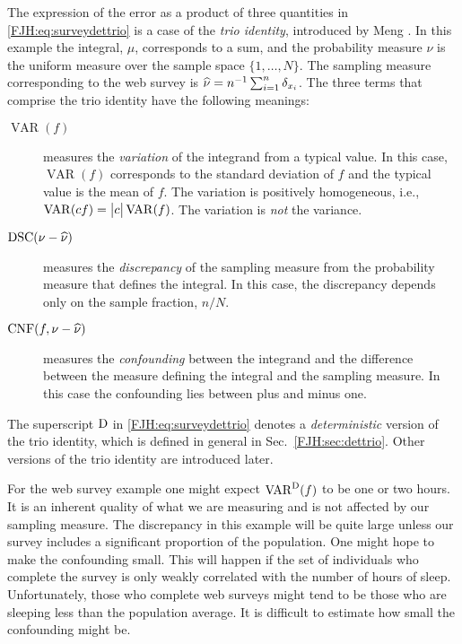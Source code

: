 \documentclass[graybox,footinfo]{svmult}
\DeclareMathOperator{\algn}{CNF}
\DeclareMathOperator{\disc}{DSC}
\DeclareMathOperator{\Var}{VAR}
\begin{document}
The expression of the error as a product of three quantities in 
\eqref{FJH:eq:surveydettrio} is a case of the \emph{trio identity}, introduced by Meng 
\cite{Men16a}.  In this example the integral, $\mu$, corresponds to a sum, 
and the probability measure $\nu$ is the uniform measure over the sample space $\{1, 
\ldots, N\}$.  The sampling measure corresponding to the web survey is $\widehat{\nu} = 
n^{-1} \sum_{i=1}^n \delta_{x_i}$.  The three terms that comprise the trio identity have the 
following meanings:
\begin{description}
	\item[$\Var(f)$] measures the \emph{variation} of the integrand from a typical value. 
	In 	this case, $\Var(f)$ corresponds to the standard deviation of $f$ and the typical 
	value	is the mean of $f$. The variation is positively homogeneous, i.e., $\Var(cf)  = 
	\abs{c} \Var(f)$.  The variation is \emph{not} the variance.
	\item [$\disc(\nu - \hnu)$] measures the \emph{discrepancy} of the sampling 
	measure 
	from the probability measure that defines the integral.  In this case, the discrepancy 
	depends only on the sample fraction, $n/N$.
	\item [$\algn(f,\nu - \hnu)$] measures the \emph{confounding} between the 
	integrand and the difference between the measure defining the integral and the 
	sampling measure.  In this case the confounding lies between plus and minus one.
\end{description}
The superscript $\textup{D}$ in \eqref{FJH:eq:surveydettrio} denotes a \emph{deterministic} 
version of the trio identity, which is defined in general in Sec.\ \ref{FJH:sec:dettrio}. 
Other versions of the trio identity are introduced later.

\begin{FJHLesson}
	\FJHLessonZero
\end{FJHLesson}

For the web survey example one might expect $\Var^\Dt(f)$ to be one or two hours.  It 
is an inherent quality of what we are measuring and is not affected by our sampling 
measure.  The discrepancy in this example will be quite large unless our survey includes a 
significant proportion of the population.  One might hope to make  the confounding 
small.  This will happen if the set of individuals who complete the survey 
is only weakly correlated with the number of hours of sleep.  Unfortunately, those who  
complete web surveys might tend to be those who are sleeping less than the 
population average.  It is difficult to estimate how small the confounding might be.  
\end{document}
